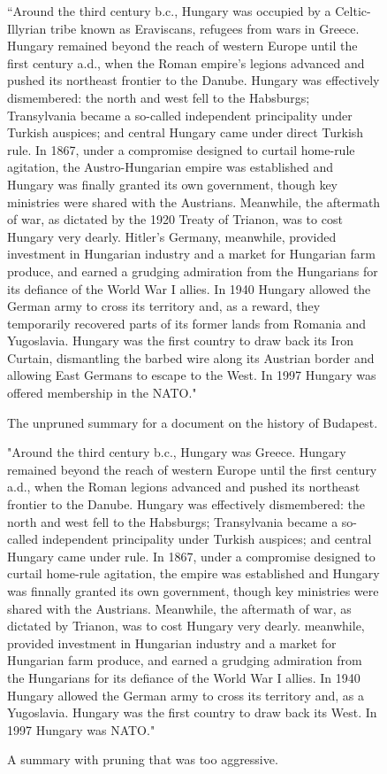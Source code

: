 \documentclass[12pt]{article}
\theoremstyle{plain}
\theoremstyle{definition}
\theoremstyle{remark}
\theoremstyle{plain}
\begin{document}
\begin{figure}
	``Around the third century b.c., Hungary was occupied by a Celtic-Illyrian tribe known as Eraviscans, refugees from wars in Greece.
Hungary remained beyond the reach of western Europe until the first century a.d., when the Roman empire's legions advanced and pushed its northeast frontier to the Danube.
Hungary was effectively dismembered: the north and west fell to the Habsburgs; Transylvania became a so-called independent principality under Turkish auspices; and central Hungary came under direct Turkish rule.
In 1867, under a compromise designed to curtail home-rule agitation, the Austro-Hungarian empire was established and Hungary was finally granted its own government, though key ministries were shared with the Austrians.
Meanwhile, the aftermath of war, as dictated by the 1920 Treaty of Trianon, was to cost Hungary very dearly.
Hitler's Germany, meanwhile, provided investment in Hungarian industry and a market for Hungarian farm produce, and earned a grudging admiration from the Hungarians for its defiance of the World War I allies.
In 1940 Hungary allowed the German army to cross its territory and, as a reward, they temporarily recovered parts of its former lands from Romania and Yugoslavia.
Hungary was the first country to draw back its Iron Curtain, dismantling the barbed wire along its Austrian border and allowing East Germans to escape to the West.
In 1997 Hungary was offered membership in the NATO."
\caption{The unpruned summary for a document on the history of Budapest.}\label{rawsummary}
\end{figure}
	
\begin{figure}
"Around the third century b.c., Hungary was Greece. Hungary remained beyond the reach of western Europe until the first century a.d., when the Roman legions advanced and pushed its northeast frontier to the Danube. Hungary was effectively dismembered: the north and west fell to the Habsburgs; Transylvania became a so-called independent principality under Turkish auspices; and central Hungary came under rule. In 1867, under a compromise designed to curtail home-rule agitation, the empire was established and Hungary was finnally granted its own government, though key ministries were shared with the Austrians. Meanwhile, the aftermath of war, as dictated by Trianon, was to cost Hungary very dearly. meanwhile, provided investment in Hungarian industry and a market for Hungarian farm produce, and earned a grudging admiration from the Hungarians for its defiance of the World War I allies. In 1940 Hungary allowed the German army to cross its territory and, as a Yugoslavia. Hungary was the first country to draw back its West. In 1997 Hungary was NATO."
\caption{A summary with pruning that was too aggressive.}\label{badsummary}
\end{figure}
\end{document}
